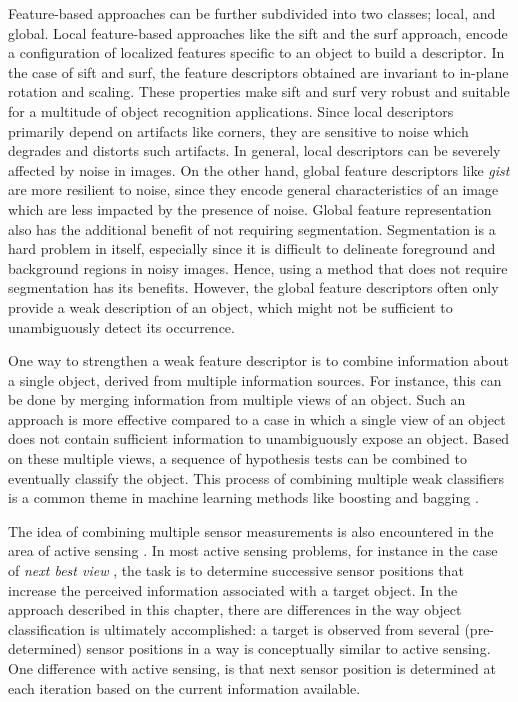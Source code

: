 Feature-based approaches can be further subdivided into two classes; local, and global. Local feature-based approaches like the \gls{sift} \cite{sift} and the \gls{surf} \cite{surf} approach, encode a configuration of localized features specific to an object to build a descriptor. In the case of \gls{sift} and \gls{surf}, the feature descriptors obtained are invariant to in-plane rotation and scaling. These properties make \gls{sift} and \gls{surf} very robust and suitable for a multitude of object recognition applications. Since local descriptors primarily depend on artifacts like corners, they are sensitive to noise which degrades and distorts such artifacts. In general, local descriptors can be severely affected by noise in images. On the other hand, global feature descriptors like \textit{gist} \cite{gist} are more resilient to noise, since they encode general characteristics of an image which are less impacted by the presence of noise. Global feature representation also has the additional benefit of not 
requiring segmentation. Segmentation is a hard problem in itself, especially since
it is difficult to delineate foreground and background regions in noisy images. Hence, using a method that does not require segmentation has its benefits. However, the global feature descriptors often only provide a weak description of an object, which might not be sufficient to unambiguously detect its occurrence.

One way to strengthen a weak feature descriptor is to combine information about a single object, derived from multiple information sources. For instance, this can be done by merging information from multiple views of an object. Such an approach is more effective compared to a case in which a single view of an object does not contain sufficient information to unambiguously expose an object. Based on these multiple views, a sequence of hypothesis tests can be combined to eventually classify the object. This process of combining multiple weak classifiers is a common theme in machine learning methods like boosting and bagging \cite{alpaydin}.

The idea of combining multiple sensor measurements is also encountered in the area of active sensing \cite{chen}. In most active sensing problems, for instance in the case of \emph{next best view} \cite{roy,dunn}, the task is to determine successive sensor positions that increase the perceived information  associated with a target object. In the approach described in this chapter, there are differences in the way object classification is ultimately accomplished: a target is observed from several (pre-determined) sensor positions in a way is conceptually similar to active sensing. One difference with active sensing, is that next sensor position is determined at each iteration based on the current information available.

